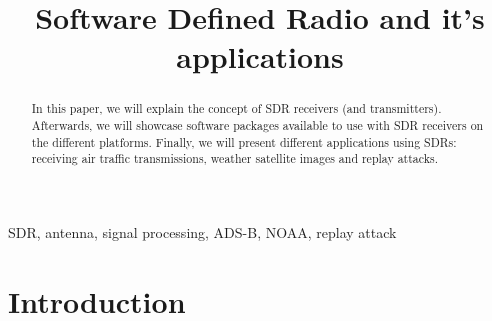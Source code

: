 \documentclass[conference]{IEEEtran}
\begin{document}
\title{Software Defined Radio and it's applications
}

\author{
	\and
}

\maketitle

\begin{abstract}
In this paper, we will explain the concept of SDR receivers (and transmitters). Afterwards, we will showcase software packages available to use with SDR receivers on the different platforms. Finally, we will present different applications using SDRs: receiving air traffic transmissions, weather satellite images and replay attacks.
\end{abstract}

\begin{IEEEkeywords}
SDR, antenna, signal processing, ADS-B, NOAA, replay attack 
\end{IEEEkeywords}

\section{Introduction} %
\end{document}
